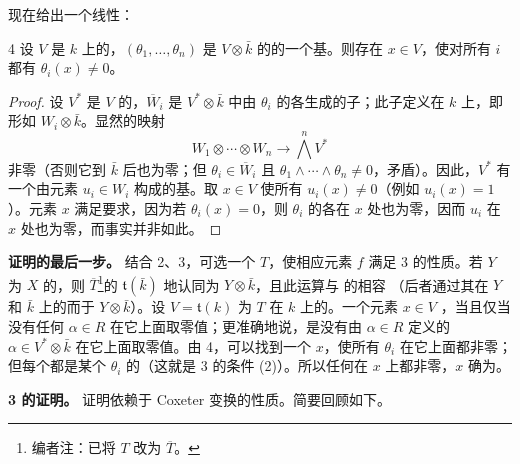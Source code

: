 现在给出一个线性：
\begin{SGAresult}{}{4}
设 $V$ 是 $k$ 上的，$(\theta_1,\ldots,\theta_n)$ 是 $V\otimes\bar k$ 的的一个基。则存在 $x\in V$，使对所有 $i$ 都有 $\theta_i(x)\ne0$。
\end{SGAresult}
\begin{proof}
设 $V^*$ 是 $V$ 的，$\overline W_i$ 是 $V^*\otimes\bar k$ 中由 $\theta_i$ 的各生成的子；此子定义在 $k$ 上，即形如 $W_i\otimes\bar k$。显然的映射
\[W_1\otimes\cdots\otimes W_n\longrightarrow\bigwedge^nV^*\]
非零（否则它到 $\bar k$ 后也为零；但 $\theta_i\in\overline W_i$ 且 $\theta_1\wedge\cdots\wedge\theta_n\ne0$，矛盾）。因此，$V^*$ 有一个由元素 $u_i\in W_i$ 构成的基。取 $x\in V$ 使所有 $u_i(x)\ne0$（例如 $u_i(x)=1$）。元素 $x$ 满足要求，因为若 $\theta_i(x)=0$，则 $\theta_i$ 的各在 $x$ 处也为零，因而 $u_i$ 在 $x$ 处也为零，而事实并非如此。
\end{proof}
\textbf{证明的最后一步。} 结合 2、3，可选一个 $T$，使相应元素 $f$ 满足 3 的性质。若 $Y$ 为 $X$ 的，则 $\overline T$\footnote{编者注：已将 $T$ 改为 $\overline T$。}的 $\mathfrak t(\bar k)$ 地认同为 $Y\otimes\bar k$，且此运算与 的相容
（后者通过其在 $Y$ 和 $\bar k$ 上的而于 $Y\otimes\bar k$）。设 $V=\mathfrak t(k)$ 为 $T$ 在 $k$ 上的。一个元素 $x\in V$ ，当且仅当没有任何 $\alpha\in R$ 在它上面取零值；更准确地说，是没有由 $\alpha\in R$ 定义的 $\alpha\in V^*\otimes\bar k$ 在它上面取零值。由 4，可以找到一个 $x$，使所有 $\theta_i$ 在它上面都非零；但每个都是某个 $\theta_i$ 的（这就是 3 的条件 (2)）。所以任何在 $x$ 上都非零，$x$ 确为。

\textbf{ 3 的证明。} 证明依赖于 Coxeter 变换的性质。简要回顾如下。

